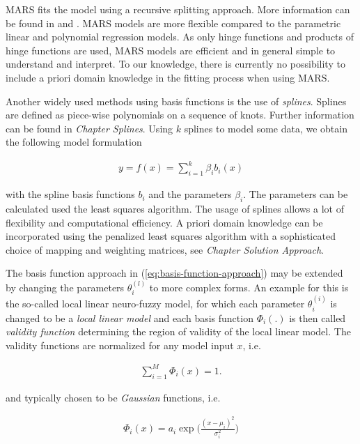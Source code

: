 \documentclass[10pt,a4paper]{article}
\begin{document}
MARS fits the model using a recursive splitting approach. More information can be found in \cite{friedman1991multivariate} and \cite{friedman2001elements}. MARS models are more flexible compared to the parametric linear and polynomial regression models. As only hinge functions and products of hinge functions are used, MARS models are efficient and in general simple to understand and interpret. To our knowledge, there is currently no possibility to include a priori domain knowledge in the fitting process when using MARS. 

Another widely used methods using basis functions is the use of \emph{splines}. Splines are defined as piece-wise polynomials on a sequence of knots. Further information can be found in \emph{Chapter Splines}. \cite{deBoor1978practicalGuideToSplines} Using $k$ splines to model some data, we obtain the following model formulation

\begin{align} \label{eq:Spline-basis-formulation}
	y = f(x) = \sum_{i=1}^k \beta_i b_i(x) 
\end{align}

with the spline basis functions $b_i$ and the parameters $\beta_i$. The parameters can be calculated used the least squares algorithm. The usage of splines allows a lot of flexibility and computational efficiency. A priori domain knowledge can be incorporated using the penalized least squares algorithm with a sophisticated choice of mapping and weighting matrices, see \emph{Chapter Solution Approach}.\cite{hofner2011monotonicity}

The basis function approach in (\ref{eq:basis-function-approach}) may be extended by changing the parameters $\theta_i^{(l)}$ to more complex forms. An example for this is the so-called local linear neuro-fuzzy model, for which each parameter $\theta_i^{(i)}$ is changed to be a \emph{local linear model} and each basis function $\Phi_i(.)$ is then called \emph{validity function} determining the region of validity of the local linear model. \cite{nelles2013nonlinear} The validity functions are normalized for any model input $x$, i.e.

\begin{align} \label{eq:LILOMOT-normalized-basis-fucntions}
	\sum_{i=1}^M \Phi_i(x) = 1.
\end{align}

and typically chosen to be \emph{Gaussian} functions, i.e. 

\begin{align} \label{eq:validity-function}
	\Phi_i(x) = a_i \exp \big(\frac{(x - \mu_i)^2}{\sigma_i^2} \big)	
\end{align}
\end{document}
